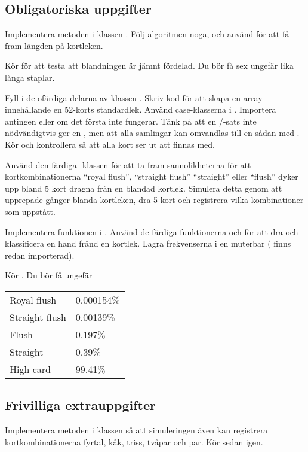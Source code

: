 \subsection{Obligatoriska uppgifter}

\Task 
\Subtask Implementera metoden  i klassen . Följ algoritmen noga, och använd  för att få fram längden på kortleken. 

\Subtask Kör  för att testa att blandningen är jämnt fördelad. Du bör få sex ungefär lika långa staplar.

\Task Fyll i de ofärdiga delarna av klassen .
\Subtask Skriv kod för att skapa en array innehållande en 52-korts standardlek. Använd case-klasserna i . Importera antingen  eller  om det första inte fungerar. Tänk på att en /-sats inte nödvändigtvis ger en , men att alla samlingar kan omvandlas till en sådan med .
\Subtask Kör  och kontrollera så att alla kort ser ut att finnas med.

\Task Använd den färdiga -klassen för att ta fram sannolikheterna för att kortkombinationerna ``royal flush'', ``straight flush'' ``straight'' eller ``flush'' dyker upp bland 5 kort dragna från en blandad kortlek. Simulera detta genom att upprepade gånger blanda kortleken, dra 5 kort och registrera vilka kombinationer som uppstått.

\Subtask Implementera funktionen  i . Använd de färdiga funktionerna  och  för att dra och klassificera en hand frånd en kortlek. Lagra frekvenserna i en muterbar  ( finns redan importerad).

\Subtask Kör . Du bör få ungefär \\
\begin{tabular}{ll}
Royal flush    & 0.000154\% \\
Straight flush & 0.00139\%  \\
Flush          & 0.197\%    \\
Straight       & 0.39\%     \\
High card      & 99.41\%
\end{tabular}


\subsection{Frivilliga extrauppgifter}

\Task Implementera metoden  i klassen  så att simuleringen även kan registrera kortkombinationerna fyrtal, kåk, triss, tvåpar och par. Kör sedan  igen.
